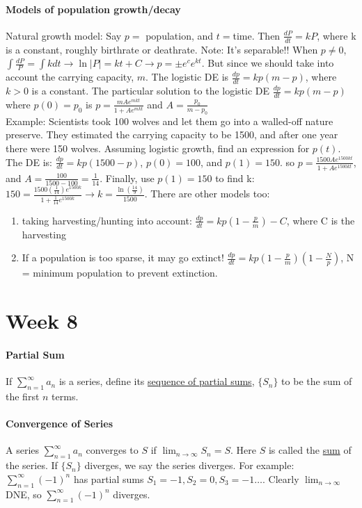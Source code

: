 \documentclass[10pt,letter]{article}
\begin{document}
\paragraph{Models of population growth/decay} Natural growth model: Say $p=$ population, and $t=$time. Then $\frac{dP}{dt}=kP$, where k is a constant, roughly birthrate or deathrate. Note: It's separable!! When $p\neq0$, $\int\frac{dP}{P}=\int kdt\rightarrow \ln|P| = kt+C\rightarrow p = \pm e^ce^{kt}$. But since we should take into account the carrying capacity, $m$. The logistic DE is $\frac{dp}{dt}=kp(m-p)$, where $k>0$ is a constant. The particular solution to the logistic DE $\frac{dp}{dt}=kp(m-p)$ where $p(0)=p_0$ is $p=\frac{mAe^{mkt}}{1+Ae^{mkt}}$ and $A = \frac{p_0}{m-p_0}$ \\ 
Example: Scientists took 100 wolves and let them go into a walled-off nature preserve. They estimated the carrying capacity to be 1500, and after one year there were 150 wolves. Assuming logistic growth, find an expression for $p(t)$. The DE is: $\frac{dp}{dt}=kp(1500-p)$, $p(0) = 100$, and $p(1)=150$. so $p=\frac{1500Ae^{1500kt}}{1+Ae^{1500kt}}$, and $A = \frac{100}{1500-100}=\frac{1}{14}$. Finally, use $p(1)=150$ to find k: $150 = \frac{1500(\frac{1}{14})e^{1500k}}{1+\frac{1}{14}e^{1500k}}\longrightarrow k=\frac{\ln(\frac{14}{9})}{1500}$. There are other models too: \begin{enumerate}
    \item taking harvesting/hunting into account: $\frac{dp}{dt}=kp(1-\frac{p}{m})-C$, where C is the harvesting 
    \item If a population is too sparse, it may go extinct! $\frac{dp}{dt}=kp(1-\frac{p}{m})(1-\frac{N}{p})$, N = minimum population to prevent extinction. 
\end{enumerate}

\pagebreak

\section*{Week 8} 
\paragraph{Partial Sum} If $\sum_{n=1}^\infty a_n$ is a series, define its \underline{sequence of partial sums}, $\{S_n\}$ to be the sum of the first $n$ terms. 
\paragraph{Convergence of Series} A series $\sum_{n=1}^\infty a_n$ converges to $S$ if $\lim_{n\rightarrow\infty}S_n=S$. Here $S$ is called the \underline{sum} of the series. If $\{S_n\}$ diverges, we say the series diverges. For example: $\sum_{n=1}^\infty(-1)^n$ has partial sums $S_1 = -1, S_2=0, S_3=-1\ldots$. Clearly $\lim_{n\rightarrow\infty}$ DNE, so $\sum_{n=1}^\infty(-1)^n$ diverges. 
\end{document}
